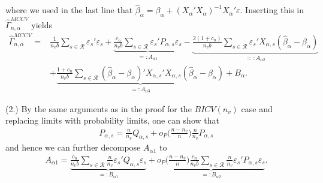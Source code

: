 \documentclass[Research_Module_ES.tex]{subfiles}
\begin{document}
where we used in the last line that $\hat{\beta}_\alpha = \beta_\alpha + (X_\alpha'X_\alpha)^{-1}X_\alpha'\varepsilon$. Inserting this in $\hat{\Gamma}_{n,\alpha}^{MCCV}$ yields 
\begin{align*}
\hat{\Gamma}_{n,\alpha}^{MCCV} 
= &\frac{1}{n_vb}\sum_{s\in \mathcal{R}}\varepsilon_s'\varepsilon_s 
+ \underbrace{\frac{c_n}{n_vb}\sum_{s\in \mathcal{R}}\varepsilon_s'P_{\alpha,s}\varepsilon_s}_{=:A_{\alpha1}}
- \underbrace{\frac{2(1+c_n)}{n_vb}\sum_{s\in \mathcal{R}}\varepsilon_s'X_{\alpha,s}(\hat{\beta}_\alpha-\beta_\alpha)}_{=:A_{\alpha2}}\\
&+ \underbrace{\frac{1+c_n}{n_vb}\sum_{s\in \mathcal{R}}(\hat{\beta}_\alpha-\beta_\alpha)'X_{\alpha,s}'X_{\alpha,s}(\hat{\beta}_\alpha-\beta_\alpha)}_{=:A_{\alpha3}} + B_{\alpha}.
\end{align*}

(2.)
By the same arguments as in the proof for the $BICV(n_v)$ case and replacing limits with probability limits, one can show that
\begin{align*}
P_{\alpha,s}=\frac{n}{n_v}Q_{\alpha,s}+o_P\biggl(\frac{n-n_v}{n}\biggr)\frac{n}{n_v}P_{\alpha,s}
\end{align*}
and hence we can further decompose $A_{\alpha1}$ to
\begin{align*}
A_{\alpha1}= \underbrace{\frac{c_n}{n_vb}\sum_{s\in\mathcal{R}}\frac{n}{n_v}\varepsilon_s'Q_{\alpha,s}\varepsilon_s}_{=:B_{\alpha1}}
+ \underbrace{o_P\biggl(\frac{n-n_v}{n}\biggr)\frac{c_n}{n_vb}\sum_{s\in\mathcal{R}}\frac{n}{n_v}\varepsilon_s'P_{\alpha,s}\varepsilon_s}_{=:B_{\alpha2}}.
\end{align*}
\end{document}
